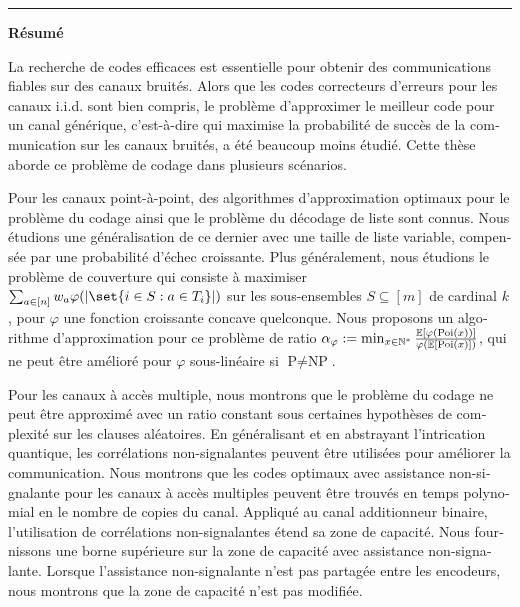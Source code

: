 \clearpage 

\flushright
\bigskip
\hrule \bigskip \bigskip
{\Huge \textbf{\textsf{Résumé}}}
\flushleftright
{}
\vspace{1.5cm}

\begin{otherlanguage}{french}
  La recherche de codes efficaces est essentielle pour obtenir des communications fiables sur des canaux bruités. Alors que les codes correcteurs d'erreurs pour les canaux i.i.d. sont bien compris, le problème d'approximer le meilleur code pour un canal générique, c'est-à-dire qui maximise la probabilité de succès de la communication sur les canaux bruités, a été beaucoup moins étudié. Cette thèse aborde ce problème de codage dans plusieurs scénarios.
  
  Pour les canaux point-à-point, des algorithmes d'approximation optimaux pour le problème du codage ainsi que le problème du décodage de liste sont connus. Nous étudions une généralisation de ce dernier avec une taille de liste variable, compensée par une probabilité d'échec croissante. Plus généralement, nous étudions le problème de couverture qui consiste à maximiser $\sum_{a \in [n]} w_a \varphi(\abs{\set{i \in S : a \in T_i}})$ sur les sous-ensembles $S \subseteq [m]$ de cardinal $k$, pour $\varphi$ une fonction croissante concave quelconque. Nous proposons un algorithme d'approximation pour ce problème de ratio $\alpha_{\varphi} := \min_{x \in \mathbb{N}^*} \frac{\mathbb{E}[\varphi(\operatorname{\text{Poi}}(x))]}{\varphi(\mathbb{E}[\operatorname{\text{Poi}}(x)])}$, qui ne peut être amélioré pour $\varphi$ sous-linéaire si $\textrm{P}\not=\textrm{NP}$.
  
  Pour les canaux à accès multiple, nous montrons que le problème du codage ne peut être approximé avec un ratio constant sous certaines hypothèses de complexité sur les clauses aléatoires. En généralisant et en abstrayant l'intrication quantique, les corrélations non-signalantes peuvent être utilisées pour améliorer la communication. Nous montrons que les codes optimaux avec assistance non-signalante pour les canaux à accès multiples peuvent être trouvés en temps polynomial en le nombre de copies du canal. Appliqué au canal additionneur binaire, l'utilisation de corrélations non-signalantes étend sa zone de capacité. Nous fournissons une borne supérieure sur la zone de capacité avec assistance non-signalante. Lorsque l'assistance non-signalante n'est pas partagée entre les encodeurs, nous montrons que la zone de capacité n'est pas modifiée.
  

\end{otherlanguage}

